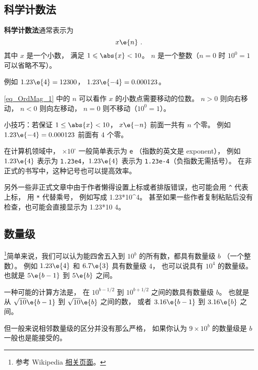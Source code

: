 
\begin{issues}
\issueDraft
\end{issues}

\subsection{科学计数法}
\textbf{科学计数法}通常表示为
\begin{equation}\label{eq_OrdMag_1}
x \e{n}~.
\end{equation}
其中 $x$ 是一个小数， 满足 $1 \leqslant \abs{x} < 10$。 $n$ 是一个整数（$n=0$ 时 $10^{0} = 1$ 可以省略不写）。

例如 $1.23\e{4} = 12300$， $1.23\e{-4} = 0.000123$。

\autoref{eq_OrdMag_1} 中的 $n$ 可以看作 $x$ 的小数点需要移动的位数。 $n > 0$ 则向右移动， $n < 0$ 则向左移动， $n=0$ 则不移动（$10^{0} = 1$）。

小技巧：若保证 $1 \le \abs{x} < 10$， $x\e{-n}$ 前面一共有 $n$ 个零。 例如 $1.23\e{-4} = 0.000123$ 前面有 4 个零。

在计算机领域中， $\times 10^\square$ 一般简单表示为 \verb`e` （指数的英文是 exponent）， 例如 $1.23\e{4}$ 表示为 \verb`1.23e4`，$1.23\e{4}$ 表示为 \verb`1.23e-4`（负指数无需括号）。 在非正式的书写中，这种记号也可以提高效率。

另外一些非正式文章中由于作者懒得设置上标或者排版错误，也可能会用 \verb`^` 代表上标， 用 \verb`*` 代替乘号， 例如写成 1.23*10^4。 甚至如果一些作者复制粘贴后没有检查，也可能会直接显示为 1.23*10 4。

\subsection{数量级}
\footnote{参考 Wikipedia \href{https://en.wikipedia.org/wiki/Order_of_magnitude}{相关页面}。}简单来说，我们可以认为能四舍五入到 $10^b$ 的所有数，都具有数量级 $b$ （一个整数）。 例如 $1.23\e{4}$ 和 $6.7\e{3}$ 具有数量级 $4$， 也可以说具有 $10^4$ 的数量级。 也就是 $5\e{b-1}$ 到 $5\e{b}$ 之间。

一种可能的计算方法是， 在 $10^{b-1/2}$ 到 $10^{b+1/2}$ 之间的数具有数量级 $b$。 也就是从 $\sqrt{10}\e{b-1}$ 到 $\sqrt{10}\e{b}$ 之间的数， 或者 $3.16\e{b-1}$ 到 $3.16\e{b}$ 之间。

但一般来说相邻数量级的区分并没有那么严格， 如果你认为 $9\times 10^b$ 的数量级是 $b$ 一般也是能接受的。
